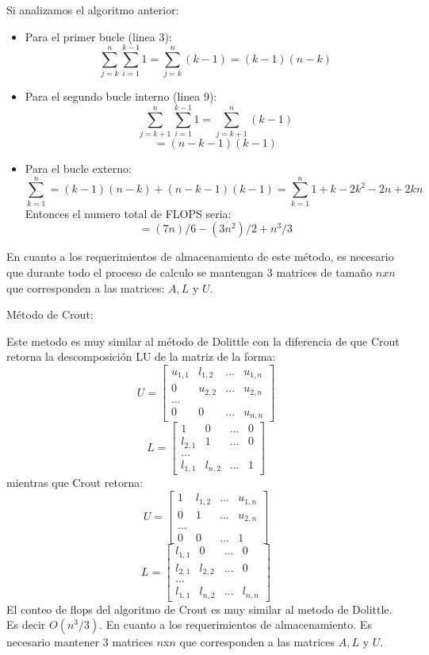Si analizamos el algoritmo anterior:
\begin{itemize}
    \item Para el primer bucle (linea 3):
    $$\sum_{j=k}^{n}\sum_{i=1}^{k-1}1=\sum_{j=k}^{n}(k-1)=(k-1)(n-k)$$
    \item Para el segundo bucle interno (linea 9):
    $$\sum_{j=k+1}^{n}\sum_{i=1}^{k-1}1=\sum_{j=k+1}^{n}(k-1)$$
    $$=(n-k-1)(k-1)$$
    \item Para el bucle externo:
     $$\sum_{k=1}^{n}=(k-1)(n-k)+(n-k-1)(k-1)=\sum_{k=1}^{n}1 + k - 2 k^2 - 2 n + 2 k n$$
     Entonces el numero total de FLOPS seria:
     $$=(7 n)/6 - (3 n^2)/2 + n^3/3$$
     
     
\end{itemize}
En cuanto a los requerimientos de almacenamiento de este método, es necesario que durante todo el proceso de calculo se mantengan 3 matrices de tamaño $nxn$ que corresponden a las matrices: $A, L$ y $U$.

Método de Crout:

Este metodo es muy similar al método de Dolittle con la diferencia de que Crout retorna la descomposición LU de la matriz de la forma:
$$U=\begin{bmatrix}
    u_{1,1}&l_{1,2}&...&u_{1,n}\\
    0&u_{2,2}&...&u_{2,n}\\
    ...\\
    0&0&...&u_{n,n}
\end{bmatrix}$$
$$L=\begin{bmatrix}
    1&0&...&0\\
    l_{2,1}&1&...&0\\
    ...\\
    l_{1,1}&l_{n,2}&...&1
\end{bmatrix}$$
mientras que Crout retorna:
$$U=\begin{bmatrix}
    1&l_{1,2}&...&u_{1,n}\\
    0&1&...&u_{2,n}\\
    ...\\
    0&0&...&1
\end{bmatrix}$$
$$L=\begin{bmatrix}
    l_{1,1}&0&...&0\\
    l_{2,1}&l_{2,2}&...&0\\
    ...\\
    l_{1,1}&l_{n,2}&...&l_{n,n}
\end{bmatrix}$$
El conteo de flops del algoritmo de Crout es muy similar al metodo de Dolittle. Es decir $O(n^3/3)$.
En cuanto a los requerimientos de almacenamiento. Es necesario mantener 3 matrices $n$x$n$ que corresponden a las matrices $A,L$ y $U$.

